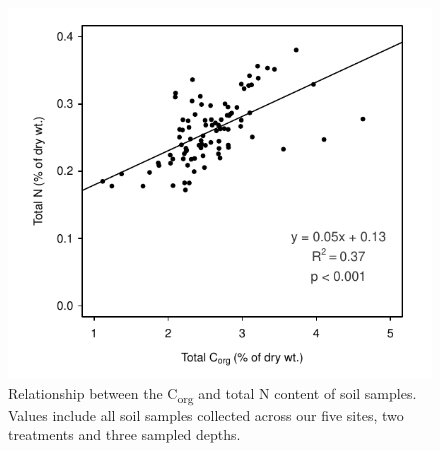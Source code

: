 \begin{figure}
  \centering
  \includegraphics[width=.95\textwidth]{Figures/chapter1/fig4}
\caption[Relationship between the C\textsubscript{org} and total N content of soil samples. Values include all soil samples collected across our five sites, two treatments and three sampled depths]{Relationship between the C\textsubscript{org} and total N content of soil samples. Values include all soil samples collected across our five sites, two treatments and three sampled depths.}
  \label{fig:1fig4}
\end{figure}

